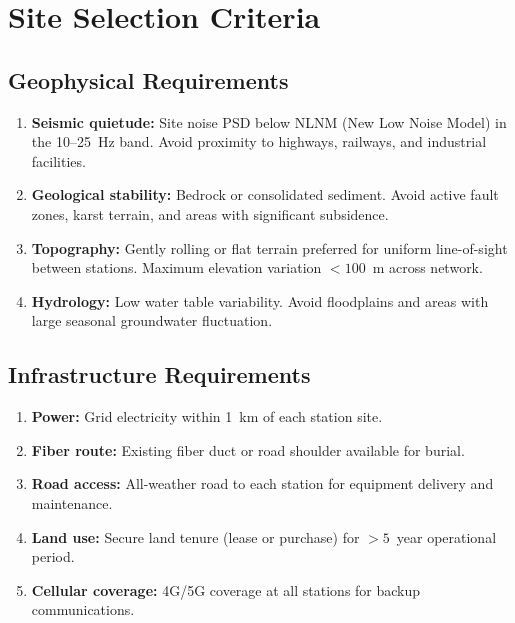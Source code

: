 \documentclass[11pt,a4paper]{article}
\begin{document}
\section{Site Selection Criteria}

\subsection{Geophysical Requirements}

\begin{enumerate}
\item \textbf{Seismic quietude:} Site noise PSD below NLNM (New Low
  Noise Model) in the 10--25~Hz band. Avoid proximity to highways,
  railways, and industrial facilities.
\item \textbf{Geological stability:} Bedrock or consolidated sediment.
  Avoid active fault zones, karst terrain, and areas with significant
  subsidence.
\item \textbf{Topography:} Gently rolling or flat terrain preferred for
  uniform line-of-sight between stations. Maximum elevation variation
  $< 100$~m across network.
\item \textbf{Hydrology:} Low water table variability. Avoid floodplains
  and areas with large seasonal groundwater fluctuation.
\end{enumerate}

\subsection{Infrastructure Requirements}

\begin{enumerate}
\item \textbf{Power:} Grid electricity within 1~km of each station site.
\item \textbf{Fiber route:} Existing fiber duct or road shoulder
  available for burial.
\item \textbf{Road access:} All-weather road to each station for
  equipment delivery and maintenance.
\item \textbf{Land use:} Secure land tenure (lease or purchase) for
  $> 5$~year operational period.
\item \textbf{Cellular coverage:} 4G/5G coverage at all stations for
  backup communications.
\end{enumerate}
\end{document}
